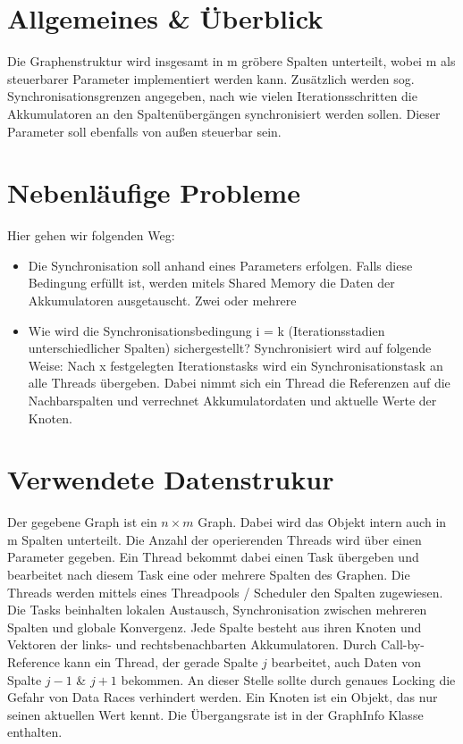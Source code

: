 
\usepackage{pdfpages}
\usepackage{listings}



\newcommand{\subttl}{\textbf{Milestone 1}}
\newcommand{\StudNameOne}{Christoph Rosenhauer (2549220)}
\newcommand{\StudNameTwo}{Lukas Schaal (2539218)}
\newcommand{\StudNameThree}{Jens Heinen (2542182)}


\section{Allgemeines \& Überblick}
Die Graphenstruktur wird insgesamt in m gröbere Spalten unterteilt, wobei m als steuerbarer Parameter implementiert werden kann. Zusätz\-lich werden sog. Synchronisationsgrenzen  angegeben, nach wie vielen Iterationsschritten die Akkumulatoren an den Spaltenübergängen synchronisiert werden sollen. Dieser Parameter soll ebenfalls von außen steuerbar sein. 

\section{Nebenläufige Probleme}
Hier gehen wir folgenden Weg:
\begin{itemize}
	\item Die Synchronisation soll anhand eines Parameters erfolgen. Falls diese Bedingung erfüllt ist, werden mitels Shared Memory die Daten der Akkumulatoren ausgetauscht. Zwei oder mehrere %
	\item Wie wird die Synchronisationsbedingung i = k (Iterationsstadien unterschiedlicher Spalten) sichergestellt?
	Synchronisiert wird auf folgende Weise: Nach x festgelegten Iterationstasks wird ein Synchronisationstask an alle Threads übergeben. Dabei nimmt sich ein Thread die Referenzen auf die Nachbarspalten und verrechnet Akkumulatordaten und aktuelle Werte der Knoten.
\end{itemize}

\section{Verwendete Datenstrukur}
Der gegebene Graph ist ein $n\times m$ Graph. Dabei wird das Objekt intern auch in m Spalten unterteilt. Die Anzahl der operierenden Threads wird über einen Parameter gegeben. Ein Thread bekommt dabei einen Task übergeben und bearbeitet nach diesem Task eine oder mehrere Spalten des Graphen. Die Threads werden mittels eines Threadpools / Scheduler den Spalten zugewiesen. Die Tasks beinhalten lokalen Austausch, Synchronisation zwischen mehreren Spalten und globale Konvergenz.
Jede Spalte besteht aus ihren Knoten und Vektoren der links- und rechtsbenachbarten Akkumulatoren. Durch Call-by-Reference kann ein Thread, der gerade Spalte $j$ bearbeitet, auch Daten von Spalte $j-1$ \& $j+1$ bekommen. An dieser Stelle sollte durch genaues Locking die Gefahr von Data Races verhindert werden. 
Ein Knoten ist ein Objekt, das nur seinen aktuellen Wert kennt. Die Übergangsrate ist in der GraphInfo Klasse enthalten. 

